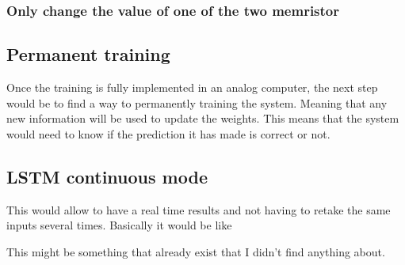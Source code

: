 \subsubsection{Only change the value of one of the two memristor}%

\subsection{Permanent training}

Once the training is fully implemented in an analog computer, the next step would be to find a way to permanently training the system. Meaning that any new information will be used to update the weights. This means that the system would need to know if the prediction it has made is correct or not.

\subsection{\ac{LSTM} continuous mode}

This would allow to have a real time results and not having to retake the same inputs several times. Basically it would be like %

This might be something that already exist that I didn't find anything about.
